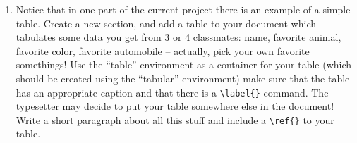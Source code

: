 \begin{enumerate}
\vfill

\clearpage

\item Notice that in one part of the current project there is an example of a simple table.  Create a new section, and add a table to your document which tabulates some data you get from 3 or 4 classmates:  name, favorite animal, favorite color, favorite automobile -- actually, pick your own favorite somethings!  Use the ``table'' environment as a container for your table (which should be created using the ``tabular'' environment)
make sure that the table has an appropriate caption and that there is a \verb+\label{}+ command.  The typesetter may decide to put your table somewhere else in the document!  Write a short paragraph about all this stuff and include a \verb+\ref{}+ to your table.

\end{enumerate}
